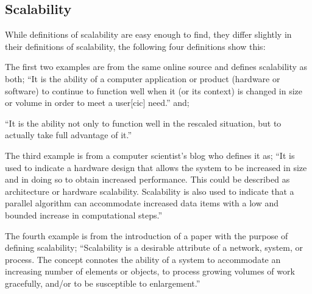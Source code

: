 \subsection{Scalability}
While definitions of scalability are easy enough to find, they differ slightly in their definitions of scalability, the following four definitions show this:

The first two examples are from the same online source and defines scalability as both;
``It is the ability of a computer application or product (hardware or software) to continue to function well when it (or its context) is changed in size or volume in order to meet a user[cic] need.''
and;

``It is the ability not only to function well in the rescaled situation, but to actually take full advantage of it.''
\cite{scaleDef1}

The third example is from a computer scientist's blog who defines it as;
``It is used to indicate a hardware design that allows the system to be increased in size and in doing so to obtain increased performance. This could be described as architecture or hardware scalability. Scalability is also used to indicate that a parallel algorithm can accommodate increased data items with a low and bounded increase in computational steps.''
\cite{scaleDef2}

The fourth example is from the introduction of a paper with the purpose of defining scalability;
``Scalability is a desirable attribute of a network, system, or
process. The concept connotes the ability of a system to
accommodate an increasing number of elements or objects, to
process growing volumes of work gracefully, and/or to be
susceptible to enlargement.''
\cite{scaleDef3}

